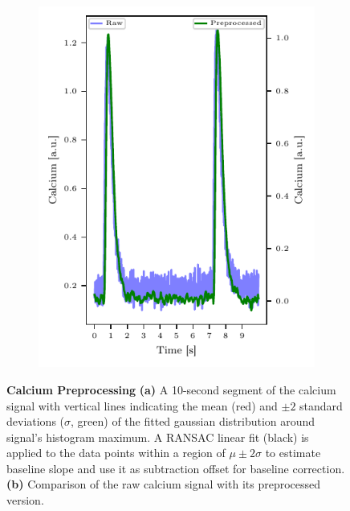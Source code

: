 \documentclass{report}
\begin{document}
\begin{figure}[t]
\begin{subfigure}[b]{0.4\textwidth}
                   \includegraphics[width=\textwidth, keepaspectratio]{plots/chapter_3/calc_raw_vs_preprocessed.pdf}
                    \caption[Calcium signal enhancement]{}
                    \label{fig:calc-preprocessed}
                \end{subfigure}
                \caption[Calcium Preprocessing]{\textbf{Calcium Preprocessing} \textbf{(a)} A 10-second segment of the calcium signal with vertical lines indicating the mean (red) and $\pm 2 $ standard deviations ($\sigma$, green) of the fitted gaussian distribution around signal's histogram maximum. A RANSAC linear fit (black) is applied to the data points within a region of $\mu \pm 2 \sigma$ to estimate baseline slope and use it as subtraction offset for baseline correction. \textbf{(b)} Comparison of the raw calcium signal with its preprocessed version.}
    \end{figure}
    
\end{document}
